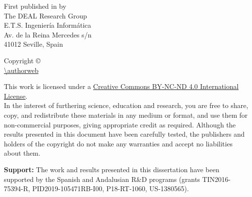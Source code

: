 \cleardoublepage

\noindent First published in \monthyeardate{} by\\
The DEAL Research Group\\
E.T.S. Ingeniería Informática\\
Av. de la Reina Mercedes s/n\\
41012 Seville, Spain

\vspace{.5cm}
\noindent Copyright \copyright{} \romanyear \autor\\
\url{\authorweb}\\
\href{mailto:\authormail}{\texttt{\authormail}}

\vspace{.5cm}

\noindent This work is licensed under a \href{http://creativecommons.org/licenses/by-nc-nd/4.0}{Creative Commons BY-NC-ND 4.0 International License}.\\
In the interest of furthering science, education and research, you are free to share, copy, and redistribute these materials in any medium or format, and use them for non-commercial purposes, giving appropriate credit as required. Although the results presented in this document have been carefully tested, the publishers and holders of the copyright do not make any warranties and accept no liabilities about them.

\vspace{10cm}

\noindent \textbf{Support:} The work and results presented in this dissertation have been supported by the Spanish and Andalusian R\&D programs (grants TIN2016-75394-R, PID2019-105471RB-I00, P18-RT-1060, US-1380565).